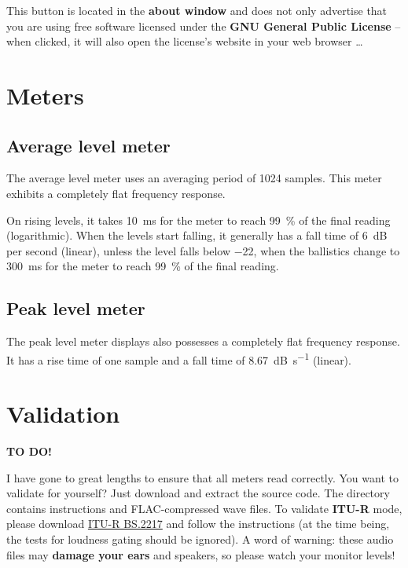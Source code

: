 This button is located in the \textbf{about window} and does not only
advertise that you are using free software licensed under the
\textbf{GNU General Public License} -- when clicked, it will also open
the license's website in your web browser \dots

\chapter{Meters}
\label{chap:meters}

\section{Average level meter}

The average level meter uses an averaging period of \num{1024}
samples.  This meter exhibits a completely flat frequency response.

On rising levels, it takes \SI{10}{\milli\second} for the meter to
reach \SI{99}{\percent} of the final reading (logarithmic).  When the
levels start falling, it generally has a fall time of \SI{6}{\dB} per
second (linear), unless the level falls below \SI{-22}{\dBFS}, when
the ballistics change to \SI{300}{\milli\second} for the meter to
reach \SI{99}{\percent} of the final reading.

\section{Peak level meter}

The peak level meter displays also possesses a completely flat
frequency response.  It has a rise time of one sample and a fall time
of \SI{8.67}{\dB\per\second} (linear).

\chapter{Validation}
\label{chap:validation}

\textbf{TO DO!}

I have gone to great lengths to ensure that all meters read correctly.
You want to validate for yourself?  Just download and extract the
source code.  The directory  contains instructions
and FLAC-compressed wave files.  To validate \textbf{ITU-R} mode,
please download \href{http://www.itu.int/pub/R-REP-BS.2217}{ITU-R
  BS.2217} and follow the instructions (at the time being, the tests
for loudness gating should be ignored).  A word of warning: these
audio files may \textbf{damage your ears} and speakers, so please
watch your monitor levels!

